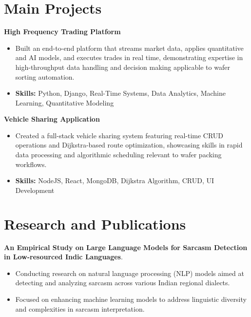 \documentclass[a4paper,11pt]{article}
\begin{document}
\section{\textbf{Main Projects}}

\vspace{1mm}
  \textbf{High Frequency Trading Platform  }
\vspace{-1.5mm} %
\begin{itemize}
  \item Built an end-to-end platform that streams market data, applies quantitative and AI models, and executes trades in real time, demonstrating expertise in high-throughput data handling and decision making applicable to wafer sorting automation.
\vspace{-3mm}
  \item \textbf{Skills:} Python, Django, Real-Time Systems, Data Analytics, Machine Learning, Quantitative Modeling
\end{itemize}


\vspace{1mm}
   \textbf{Vehicle Sharing Application }
\vspace{-1.5mm} %
\begin{itemize}
  \item Created a full-stack vehicle sharing system featuring real-time CRUD operations and Dijkstra-based route optimization, showcasing skills in rapid data processing and algorithmic scheduling relevant to wafer packing workflows.
\vspace{-3mm}
  \item \textbf{Skills:} NodeJS, React, MongoDB, Dijkstra Algorithm, CRUD, UI Development
\end{itemize}



\section{\textbf{Research and Publications} \hfill }
\vspace{1mm}
  \textbf{An Empirical Study on Large Language Models for Sarcasm Detection in Low-resourced Indic Languages}.
\vspace{-1mm} %
\begin{itemize}
  \item Conducting research on natural language processing (NLP) models aimed at detecting and analyzing sarcasm across various Indian regional dialects.
\vspace{-3mm}
  \item Focused on enhancing machine learning models to address linguistic diversity and complexities in sarcasm interpretation.
\end{itemize}
\end{document}
